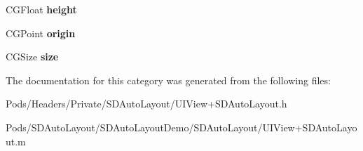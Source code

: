 \begin{DoxyCompactItemize}
\item 
\mbox{\label{category_u_i_view_07_s_d_change_frame_08_ad524a6c36b923657d9e07c725dbdb792}} 
C\+G\+Float {\bfseries height}
\item 
\mbox{\label{category_u_i_view_07_s_d_change_frame_08_ac064a4b70a74bfccd279e0a6a5fa81c4}} 
C\+G\+Point {\bfseries origin}
\item 
\mbox{\label{category_u_i_view_07_s_d_change_frame_08_a4ff7d7d2570b1cd7751b7f266677fa37}} 
C\+G\+Size {\bfseries size}
\end{DoxyCompactItemize}


The documentation for this category was generated from the following files\+:\begin{DoxyCompactItemize}
\item 
Pods/\+Headers/\+Private/\+S\+D\+Auto\+Layout/U\+I\+View+\+S\+D\+Auto\+Layout.\+h\item 
Pods/\+S\+D\+Auto\+Layout/\+S\+D\+Auto\+Layout\+Demo/\+S\+D\+Auto\+Layout/U\+I\+View+\+S\+D\+Auto\+Layout.\+m\end{DoxyCompactItemize}
